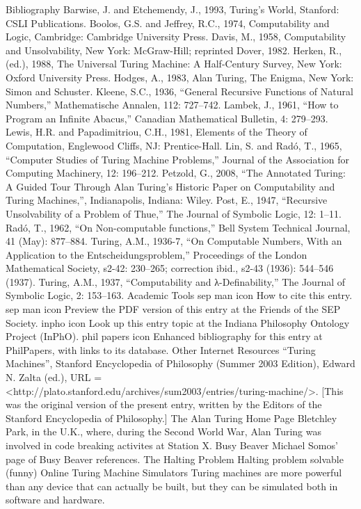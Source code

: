 Bibliography
Barwise, J. and Etchemendy, J., 1993, Turing's World, Stanford: CSLI Publications.
Boolos, G.S. and Jeffrey, R.C., 1974, Computability and Logic, Cambridge: Cambridge University Press.
Davis, M., 1958, Computability and Unsolvability, New York: McGraw-Hill; reprinted Dover, 1982.
Herken, R., (ed.), 1988, The Universal Turing Machine: A Half-Century Survey, New York: Oxford University Press.
Hodges, A., 1983, Alan Turing, The Enigma, New York: Simon and Schuster.
Kleene, S.C., 1936, “General Recursive Functions of Natural Numbers,” Mathematische Annalen, 112: 727–742.
Lambek, J., 1961, “How to Program an Infinite Abacus,” Canadian Mathematical Bulletin, 4: 279–293.
Lewis, H.R. and Papadimitriou, C.H., 1981, Elements of the Theory of Computation, Englewood Cliffs, NJ: Prentice-Hall.
Lin, S. and Radó, T., 1965, “Computer Studies of Turing Machine Problems,” Journal of the Association for Computing Machinery, 12: 196–212.
Petzold, G., 2008, “The Annotated Turing: A Guided Tour Through Alan Turing's Historic Paper on Computability and Turing Machines,”, Indianapolis, Indiana: Wiley.
Post, E., 1947, “Recursive Unsolvability of a Problem of Thue,” The Journal of Symbolic Logic, 12: 1–11.
Radó, T., 1962, “On Non-computable functions,” Bell System Technical Journal, 41 (May): 877–884.
Turing, A.M., 1936-7, “On Computable Numbers, With an Application to the Entscheidungsproblem,” Proceedings of the London Mathematical Society, s2-42: 230–265; correction ibid., s2-43 (1936): 544–546 (1937).
Turing, A.M., 1937, “Computability and λ-Definability,” The Journal of Symbolic Logic, 2: 153–163.
Academic Tools
sep man icon	How to cite this entry.
sep man icon	Preview the PDF version of this entry at the Friends of the SEP Society.
inpho icon	Look up this entry topic at the Indiana Philosophy Ontology Project (InPhO).
phil papers icon	Enhanced bibliography for this entry at PhilPapers, with links to its database.
Other Internet Resources
“Turing Machines”, Stanford Encyclopedia of Philosophy (Summer 2003 Edition), Edward N. Zalta (ed.), URL = <http://plato.stanford.edu/archives/sum2003/entries/turing-machine/>. [This was the original version of the present entry, written by the Editors of the Stanford Encyclopedia of Philosophy.]
The Alan Turing Home Page
Bletchley Park, in the U.K., where, during the Second World War, Alan Turing was involved in code breaking activites at Station X.
Busy Beaver
Michael Somos' page of Busy Beaver references.
The Halting Problem
Halting problem solvable (funny)
Online Turing Machine Simulators
Turing machines are more powerful than any device that can actually be built, but they can be simulated both in software and hardware.

